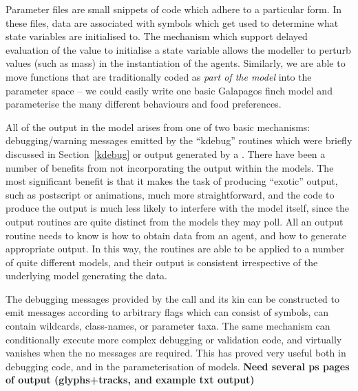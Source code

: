 Parameter files are small snippets of \Scheme code which adhere to a
particular form. In these files, data are associated with symbols
which get used to determine what state variables are initialised to.
The mechanism which support delayed evaluation of the value to
initialise a state variable allows the modeller to perturb values
(such as mass) in the instantiation of the agents.  Similarly, we are
able to move functions that are traditionally coded as \emph{part of
  the model} into the parameter space -- we could easily write one
basic Galapagos finch model and parameterise the many different
behaviours and food preferences.

\vspace{3mm}
All of the output in the model arises from one of two basic
mechanisms: debugging/warning messages emitted by the ``kdebug''
routines which were briefly discussed in Section~\ref{kdebug} or
output generated by a \mlogger.  There have been a number of benefits
from not incorporating the output within the models.  The most
significant benefit is that it makes the task of producing ``exotic''
output, such as postscript or animations, much more straightforward,
and the code to produce the output is much less likely to interfere
with the model itself, since the output routines are quite distinct
from the models they may poll.  All an output routine needs to know is
how to obtain data from an agent, and how to generate appropriate
output. In this way, the  routines are able to be
applied to a number of quite different models, and their output is
consistent irrespective of the underlying model generating the data.

The debugging messages provided by the  call and its
kin can be constructed to emit messages according to arbitrary flags
which can consist of symbols, can contain wildcards, class-names, or
parameter taxa.  The same mechanism can conditionally execute more
complex debugging or validation code, and virtually vanishes when the
no messages are required.  This has proved very useful both in
debugging code, and in the parameterisation of models.
{\textbf{Need several ps pages of output (glyphs+tracks, and example txt output)}}

